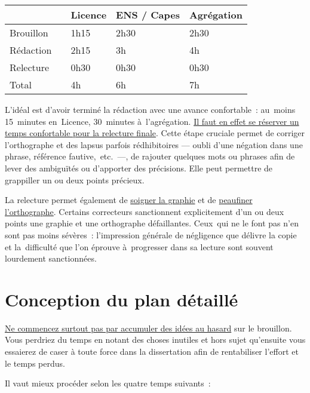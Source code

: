 \documentclass[a4paper,12pt]{report}
\begin{document}
\begin{center}
\begin{tabular}{|l|l|l|l|l|}
\hline
 &  & Licence & ENS / Capes & Agrégation\\
\hline
\hline
Brouillon &  & 1h15 & 2h30 & 2h30\\
Rédaction &  & 2h15 & 3h & 4h\\
Relecture &  & 0h30 & 0h30 & 0h30\\
\hline
\hline
Total &  & 4h & 6h & 7h\\
\hline
\end{tabular}
\end{center}

L'idéal est d'avoir terminé la rédaction avec une avance confortable :
au moins 15 minutes en Licence, 30 minutes à l'agrégation. \uline{Il faut en
effet se réserver un temps confortable pour la relecture finale}. Cette
étape cruciale permet de corriger l'orthographe et des lapsus parfois
rédhibitoires — oubli d'une négation dans une phrase, référence
fautive, etc. —, de rajouter quelques mots ou phrases afin de lever des
ambiguïtés ou d'apporter des précisions. Elle peut permettre de
grappiller un ou deux points précieux.

La relecture permet également de \uline{soigner la graphie} et de \uline{peaufiner
l'orthographe}. Certains correcteurs sanctionnent explicitement d'un ou
deux points une graphie et une orthographe défaillantes. Ceux qui ne le
font pas n'en sont pas moins sévères : l'impression générale de
négligence que délivre la copie et la difficulté que l'on éprouve
à progresser dans sa lecture sont souvent lourdement sanctionnées.


\chapter{Conception du plan détaillé}
\label{sec:orgb1ee075}

\uline{Ne commencez surtout pas par accumuler des idées au hasard} sur le
brouillon. Vous perdriez du temps en notant des choses inutiles et hors
sujet qu'ensuite vous essaierez de caser à toute force dans la
dissertation afin de rentabiliser l'effort et le temps perdus.

Il vaut mieux procéder selon les quatre temps suivants :
\end{document}
